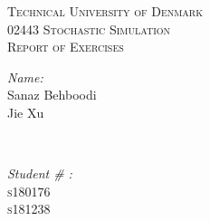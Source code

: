 \documentclass[11pt]{article}
\begin{document}
\begin{titlepage}

\newcommand{\HRule}{\rule{\linewidth}{0.5mm}} %

\center %
 


\textsc{\LARGE Technical University of Denmark}\\[1.5cm] %
\textsc{\Large 02443 Stochastic Simulation}\\[0.5cm] %
\textsc{\large Report of Exercises}\\[0.5cm] %


 

\begin{minipage}{0.4\textwidth}

\begin{flushleft} \large
\emph{Name:}\\
Sanaz Behboodi\\%
Jie Xu \\

\end{flushleft}
\end{minipage}
~
\begin{minipage}{0.4\textwidth}
\begin{flushright} \large
\emph{Student \# :} \\
\textsc{s180176}\\
\textsc{s181238}%
\end{flushright}
\end{minipage}\\[2cm]


\end{titlepage}
\end{document}
